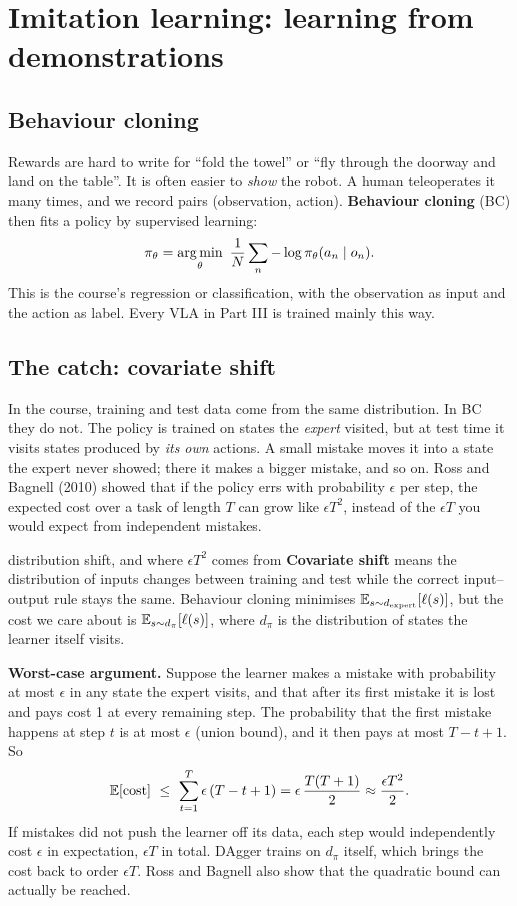 \section{Imitation learning: learning from demonstrations}
\label{sec:il}

\subsection{Behaviour cloning}
Rewards are hard to write for ``fold the towel'' or ``fly through the doorway and land on the table''. It is often easier to \emph{show} the robot. A human teleoperates it many times, and we record pairs (observation, action). \textbf{Behaviour cloning} (BC) then fits a policy by supervised learning:
\begin{equation}
\pi_\theta=\operatorname*{arg\,min}_\theta\ \frac1N\sum_n -\log\pi_\theta(a_n\mid o_n).
\end{equation}
This is the course's regression or classification, with the observation as input and the action as label. Every VLA in Part III is trained mainly this way.

\subsection{The catch: covariate shift}
In the course, training and test data come from the same distribution. In BC they do not. The policy is trained on states the \emph{expert} visited, but at test time it visits states produced by \emph{its own} actions. A small mistake moves it into a state the expert never showed; there it makes a bigger mistake, and so on. Ross and Bagnell (2010) showed that if the policy errs with probability $\epsilon$ per step, the expected cost over a task of length $T$ can grow like $\epsilon T^2$, instead of the $\epsilon T$ you would expect from independent mistakes.

\begin{probbox}{distribution shift, and where $\epsilon T^2$ comes from}
\textbf{Covariate shift} means the distribution of inputs changes between training and test while the correct input--output rule stays the same. Behaviour cloning minimises $\mathbb{E}_{s\sim d_{\text{expert}}}[\ell(s)]$, but the cost we care about is $\mathbb{E}_{s\sim d_{\pi}}[\ell(s)]$, where $d_\pi$ is the distribution of states the learner itself visits.

\textbf{Worst-case argument.} Suppose the learner makes a mistake with probability at most $\epsilon$ in any state the expert visits, and that after its first mistake it is lost and pays cost 1 at every remaining step. The probability that the first mistake happens at step $t$ is at most $\epsilon$ (union bound), and it then pays at most $T-t+1$. So
\[
\E[\text{cost}]\ \le\ \sum_{t=1}^{T}\epsilon\,(T-t+1)=\epsilon\,\frac{T(T+1)}{2}\approx\frac{\epsilon T^2}{2}.
\]
If mistakes did not push the learner off its data, each step would independently cost $\epsilon$ in expectation, $\epsilon T$ in total. DAgger trains on $d_\pi$ itself, which brings the cost back to order $\epsilon T$. Ross and Bagnell also show that the quadratic bound can actually be reached.
\end{probbox}

